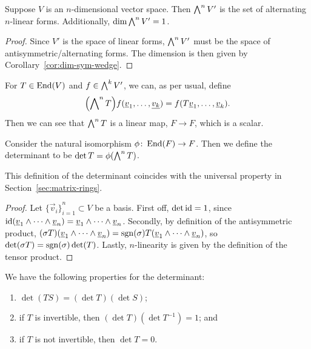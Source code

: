 \begin{theorem}
    Suppose \(V\) is an \(n\)-dimensional vector space.
    Then \(\operatorname{{\bigwedge}}^n V'\) is the set of alternating \(n\)-linear forms.
    Additionally, \(\dim \operatorname{{\bigwedge}}^n V' = 1\).
\end{theorem}
\begin{proof}
    Since \(V'\) is the space of linear forms,
    \(\operatorname{{\bigwedge}}^n V'\) must be the space of antisymmetric/alternating forms.
    The dimension is then given by Corollary~\ref{cor:dim-sym-wedge}.
\end{proof}
\begin{definition}
    For \(T \in \operatorname{End}(V)\) and \(f \in \operatorname{{\bigwedge}}^k V'\),
    we can, as per usual, define
    \begin{equation*}
        \pqty{\Asym^n T}f(\vec{v}_1,\hdots,\vec{v_k})
        = f(T\vec{v}_1,\hdots,\vec{v}_k).
    \end{equation*}
    Then we can see that \(\operatorname{{\bigwedge}}^n T\) is a linear map, \(F \to F\),
    which is a scalar.
\end{definition}
\begin{definition}
    Consider the natural isomorphism \(\phi\colon\operatorname{End}(F)\to F\).
    Then we define the determinant to be \(\det T = \phi(\operatorname{{\bigwedge}}^n T)\).
\end{definition}
\begin{proposition}
    This definition of the determinant coincides
    with the universal property in Section~\ref{sec:matrix-rings}.
\end{proposition}
\begin{proof}
    Let \({\{\vec{v}_i\}}_{i=1}^n \subset V\) be a basis.
    First off, \(\det \operatorname{id} = 1\),
    since \(\operatorname{id}(\underline{v}_1 \wedge \cdots \wedge \underline{v}_n) = \underline{v}_1 \wedge \cdots \wedge \underline{v}_n\).
    Secondly, by definition of the antisymmetric product,
    \((\sigma T)(\underline{v}_1 \wedge \cdots \wedge \underline{v}_n) = \operatorname{sgn}(\sigma) T(\underline{v}_1 \wedge \cdots \wedge \underline{v}_n)\),
    so \(\det(\sigma T) = \operatorname{sgn}(\sigma)\det(T)\).
    Lastly, \(n\)-linearity is given by the definition of the tensor product.
\end{proof}
\begin{proposition}
    We have the following properties for the determinant:
    \begin{enumerate}[label={(\alph*)}, itemsep=0mm]
        \item \(\det(TS) = (\det T)(\det S)\);
        \item if \(T\) is invertible, then \((\det T)(\det T^{-1}) = 1\); and
        \item if \(T\) is not invertible, then \(\det T = 0\).
    \end{enumerate}
\end{proposition}
